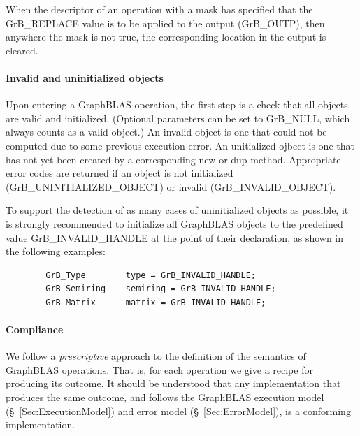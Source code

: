 When the descriptor of an operation with a mask has specified that 
the {\sf GrB\_REPLACE} value is to be applied to the output ({\sf GrB\_OUTP}),
then anywhere the mask is not {\sf true}, the corresponding location in
the output is cleared.

 

\paragraph{Invalid and uninitialized objects}

Upon entering a GraphBLAS operation, the first step is a check that all
objects are valid and initialized. (Optional parameters can be set to {\sf
GrB\_NULL}, which always counts as a valid object.)  An invalid object is
one that could not be computed due to some previous execution error. An
unitialized ojbect is one that has not yet been created by a corresponding
{\sf new} or {\sf dup} method.  Appropriate error codes are returned if
an object is not initialized ({\sf GrB\_UNINITIALIZED\_OBJECT}) or invalid
({\sf GrB\_INVALID\_OBJECT}).

To support the detection of as many cases of uninitialized objects as possible,
it is strongly recommended to initialize all GraphBLAS objects to
the predefined value {\sf GrB\_INVALID\_HANDLE} at the point of their declaration,
as shown in the following examples:

\begin{verbatim}
        GrB_Type        type = GrB_INVALID_HANDLE;
        GrB_Semiring    semiring = GrB_INVALID_HANDLE;
        GrB_Matrix      matrix = GrB_INVALID_HANDLE;
\end{verbatim}

\paragraph{Compliance}

We follow a \emph{prescriptive} approach to the definition of the semantics
of GraphBLAS operations. That is, for each operation we give a recipe for
producing its outcome.
It should be understood that any implementation that produces the same outcome,
and follows the GraphBLAS execution model (\S~\ref{Sec:ExecutionModel}) and
error model (\S~\ref{Sec:ErrorModel}), is a conforming implementation.
